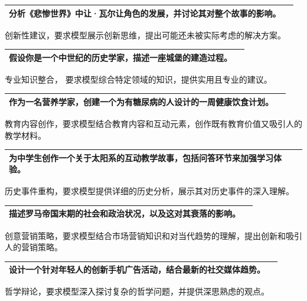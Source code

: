 \documentclass[12pt]{book}
\begin{document}
\begin{tabular}{|p{15cm}|p{3cm}|}
	\hline
分析《悲惨世界》中让·瓦尔让角色的发展，并讨论其对整个故事的影响。\\
	\hline
\end{tabular}


\bigskip
创新性建议，要求模型展示创新思维，提出可能还未被实际考虑的解决方案。

\begin{tabular}{|p{15cm}|p{3cm}|}
	\hline
	假设你是一个中世纪的历史学家，描述一座城堡的建造过程。\\
	\hline
\end{tabular}


\bigskip
专业知识整合，  要求模型综合特定领域的知识，提供实用且专业的建议。

\begin{tabular}{|p{15cm}|p{3cm}|}
	\hline
作为一名营养学家，创建一个为有糖尿病的人设计的一周健康饮食计划。\\
	\hline
\end{tabular}


\bigskip
教育内容创作，要求模型结合教育内容和互动元素，创作既有教育价值又吸引人的教学材料。

\begin{tabular}{|p{15cm}|p{3cm}|}
	\hline
为中学生创作一个关于太阳系的互动教学故事，包括问答环节来加强学习体验。\\
	\hline
\end{tabular}





\bigskip
历史事件重构，要求模型提供详细的历史分析，展示其对历史事件的深入理解。

\begin{tabular}{|p{15cm}|p{3cm}|}
	\hline
描述罗马帝国末期的社会和政治状况，以及这对其衰落的影响。\\
	\hline
\end{tabular}


\bigskip
创意营销策略，要求模型结合市场营销知识和对当代趋势的理解，提出创新和吸引人的营销策略。

\begin{tabular}{|p{15cm}|p{3cm}|}
	\hline
设计一个针对年轻人的创新手机广告活动，结合最新的社交媒体趋势。\\
	\hline
\end{tabular}



\bigskip
哲学辩论，要求模型深入探讨复杂的哲学问题，并提供深思熟虑的观点。
\end{document}
